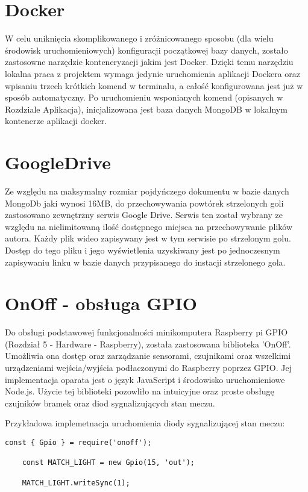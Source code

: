 \section{Docker}
W celu uniknięcia skomplikowanego i zróżnicowanego sposobu (dla wielu środowisk uruchomieniowych) konfiguracji początkowej bazy danych, zostało zastosowne narzędzie konteneryzacji jakim jest Docker. Dzięki temu narzędziu lokalna praca z projektem wymaga jedynie uruchomienia aplikacji Dockera oraz wpisaniu trzech krótkich komend w terminalu, a całość konfigurowana jest już w sposób automatyczny. Po uruchomieniu wsponianych komend (opisanych w Rozdziale Aplikacja), inicjalizowana jest baza danych MongoDB w lokalnym kontenerze aplikacji docker.

\section{GoogleDrive}
Ze względu na maksymalny rozmiar pojdyńczego dokumentu w bazie danych MongoDb jaki wynosi 16MB, do przechowywania powtórek strzelonych goli zastosowano zewnętrzny serwis Google Drive. Serwis ten został wybrany ze względu na nielimitowaną ilość dostępnego miejsca na przechowywanie plików autora. Każdy plik wideo zapisywany jest w tym serwisie po strzelonym golu. Dostęp do tego pliku i jego wyświetlenia uzyskiwany jest po jednoczesnym zapisywaniu linku w bazie danych przypisanego do instacji strzelonego gola.

\section{OnOff - obsługa GPIO}
Do obsługi podstawowej funkcjonalności minikomputera Raspberry pi GPIO (Rozdział 5 - Hardware - Raspberry), została zastosowana biblioteka 'OnOff'. Umożliwia ona dostęp oraz zarządzanie sensorami, czujnikami oraz wszelkimi urządzeniami wejścia/wyjścia podłaczonymi do Raspberry poprzez GPIO. Jej implementacja oparata jest o język JavaScript i środowisko uruchomieniowe Node.js. Użycie tej biblioteki pozowliło na intuicyjne oraz proste obsługę czujników bramek oraz diod sygnalizujących stan meczu.

Przykładowa implemetnacja uruchomienia diody sygnalizującej stan meczu:

\begin{lstlisting}[breaklines=true]
    const { Gpio } = require('onoff');

    const MATCH_LIGHT = new Gpio(15, 'out');

    MATCH_LIGHT.writeSync(1);
\end{lstlisting}

